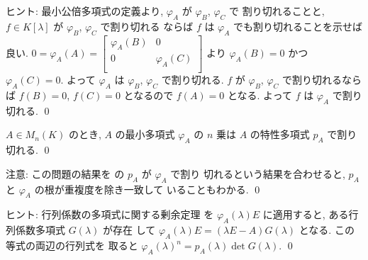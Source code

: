 \documentclass[12pt,twoside]{jarticle}
\begin{document}
\noindent
ヒント: 最小公倍多項式の定義より, $\varphi_A$ が $\varphi_B$, $\varphi_C$ で
割り切れることと, $f\in K[\lambda]$ が $\varphi_B$, $\varphi_C$ で割り切れる
ならば $f$ は $\varphi_A$ でも割り切れることを示せば良い.
$0=\varphi_A(A)= 
\begin{bmatrix}
  \varphi_A(B) & 0 \\
  0 & \varphi_A(C) \\
\end{bmatrix}$ より $\varphi_A(B)=0$ かつ $\varphi_A(C)=0$.  
よって $\varphi_A$ は $\varphi_B$, $\varphi_C$ で割り切れる.
$f$ が $\varphi_B$, $\varphi_C$ で割り切れるならば $f(B)=0$, $f(C)=0$ 
となるので $f(A) = 0$ となる.  よって $f$ は $\varphi_A$ で割り切れる.
\qed


\begin{question}
\label{q:minimal-polyn-7}
  $A\in M_n(K)$ のとき, 
  $A$ の最小多項式 $\varphi_A$ の $n$ 乗は $A$ の特性多項式 $p_A$ で割り切れる.
  \qed
\end{question}

\noindent
注意: この問題の結果を  の $p_A$ が $\varphi_A$ で割り
切れるという結果を合わせると, $p_A$ と $\varphi_A$ の根が重複度を除き一致して
いることもわかる.
\qed

\medskip
\noindent
ヒント: 
行列係数の多項式に関する剰余定理 
を $\varphi_A(\lambda)E$ に適用すると, ある行列係数多項式 $G(\lambda)$ が存在
して $\varphi_A(\lambda)E = (\lambda E - A)G(\lambda)$ となる.
この等式の両辺の行列式を
取ると $\varphi_A(\lambda)^n=p_A(\lambda)\det G(\lambda)$.
\qed

\end{document}
